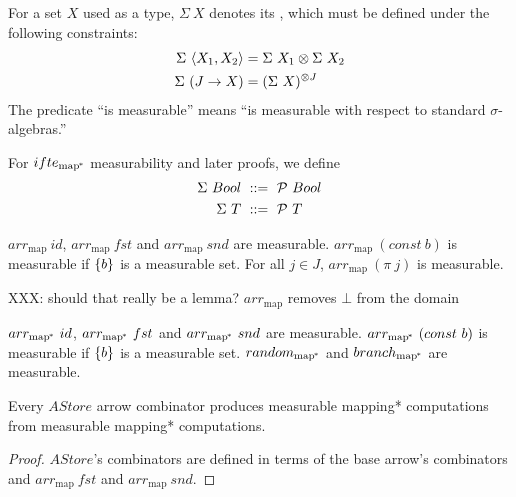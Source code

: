 \documentclass[preprint]{sigplanconf}
\newcommand{\arrowarr}{\ensuremath{arr}}
\newcommand{\arrowif}{\ensuremath{ifte}}
\newcommand{\map}{_\mathrm{map}}
\newcommand{\arrmap}{\arrowarr\map}
\newcommand{\pmap}{_\mathrm{map^{\mspace{-2mu}*}}}
\newcommand{\arrpmap}{\arrowarr\pmap}
\newcommand{\ifpmap}{\arrowif\pmap}
\begin{document}
\begin{definition}
For a set $X$ used as a type, $\Sigma~X$ denotes its , which must be defined under the following constraints:
\begin{align}
	\Sigma~\langle{X_1,X_2}\rangle & = \Sigma~X_1 \otimes \Sigma~X_2
	\label{eqn:standard-finite-product-rule}
\\
	\Sigma~(J \to X) & = (\Sigma~X)^{\otimes J}
	\label{eqn:standard-arbitrary-product-rule}
\end{align}
The predicate ``is measurable'' means ``is measurable with respect to standard $\sigma$-algebras.''
\label{def:standard-sigma-algebra}
\end{definition}

For $\ifpmap$ measurability and later proofs, we define
\begin{align}
	\Sigma~Bool &\ ::=\ \mathcal{P}~Bool
	\label{eqn:standard-boolean-rule}
\\
	\Sigma~T &\ ::=\ \mathcal{P}~T
	\label{eqn:standard-traces-rule}
\end{align}

\begin{lemma}
$\arrmap~id$, $\arrmap~fst$ and $\arrmap~snd$ are measurable.
$\arrmap~(const~b)$ is measurable if $\{{b}\}$ is a measurable set.
For all $j \in J$, $\arrmap~(\pi~j)$ is measurable.
\end{lemma}

XXX: should that really be a lemma? $\arrmap$ removes $\bot$ from the domain

\begin{corollary}
$\arrpmap~id$, $\arrpmap~fst$ and $\arrpmap~snd$ are measurable.
$\arrpmap~(const~b)$ is measurable if $\{{b}\}$ is a measurable set.
$random\pmap$ and $branch\pmap$ are measurable.
\end{corollary}

\begin{theorem}
Every $AStore$ arrow combinator produces measurable mapping* computations from measurable mapping* computations.
\label{thm:astore-measurability-transfer}
\end{theorem}
\begin{proof}
$AStore$'s combinators are defined in terms of the base arrow's combinators and $\arrmap~fst$ and $\arrmap~snd$.
\end{proof}
\end{document}
